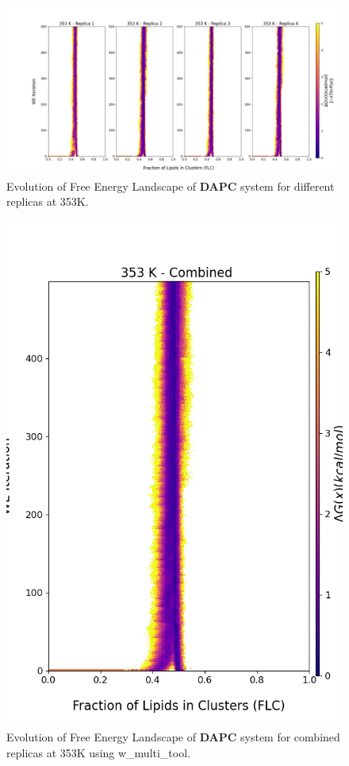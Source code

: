 \documentclass{biophys-new}
\begin{document}
\begin{figure}[hbt!]
\centering
\includegraphics[width=1.1\linewidth]{all_plots/ClusterLipids2Total/DPPC_DAPC_CHOL/353K/Evolution_DAPC_353_ClusterLipids2Total.png}
\caption{Evolution of Free Energy Landscape of \textbf{DAPC} system for different replicas at 353K.}
\label{fig:view}

\end{figure}

\begin{figure}[hbt!]
\centering
\includegraphics[width=0.8\linewidth]{all_plots/ClusterLipids2Total/DPPC_DAPC_CHOL/353K/Evolution_DAPC_MULTI__353_ClusterLipids2Total.png}
\caption{Evolution of Free Energy Landscape of \textbf{DAPC} system for combined replicas at 353K using w\_multi\_tool.}
\label{fig:view}

\end{figure}
\end{document}

